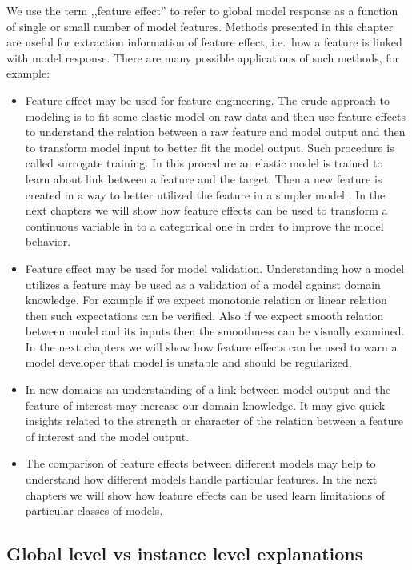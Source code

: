 \documentclass[12pt,]{krantz}
\providecommand{\tightlist}{%
  \setlength{\itemsep}{0pt}\setlength{\parskip}{0pt}}
\begin{document}
We use the term ,,feature effect'' to refer to global model response as a function of single or small number of model features.
Methods presented in this chapter are useful for extraction information of feature effect, i.e.~how a feature is linked with model response. There are many possible applications of such methods, for example:

\begin{itemize}
\tightlist
\item
  Feature effect may be used for feature engineering. The crude approach to modeling is to fit some elastic model on raw data and then use feature effects to understand the relation between a raw feature and model output and then to transform model input to better fit the model output. Such procedure is called surrogate training. In this procedure an elastic model is trained to learn about link between a feature and the target. Then a new feature is created in a way to better utilized the feature in a simpler model \citep{SAFE-arxiv}. In the next chapters we will show how feature effects can be used to transform a continuous variable in to a categorical one in order to improve the model behavior.
\item
  Feature effect may be used for model validation. Understanding how a model utilizes a feature may be used as a validation of a model against domain knowledge. For example if we expect monotonic relation or linear relation then such expectations can be verified. Also if we expect smooth relation between model and its inputs then the smoothness can be visually examined. In the next chapters we will show how feature effects can be used to warn a model developer that model is unstable and should be regularized.
\item
  In new domains an understanding of a link between model output and the feature of interest may increase our domain knowledge. It may give quick insights related to the strength or character of the relation between a feature of interest and the model output.
\item
  The comparison of feature effects between different models may help to understand how different models handle particular features. In the next chapters we will show how feature effects can be used learn limitations of particular classes of models.
\end{itemize}

\hypertarget{global-level-vs-instance-level-explanations}{%
\subsection{Global level vs instance level explanations}\label{global-level-vs-instance-level-explanations}}
\end{document}
